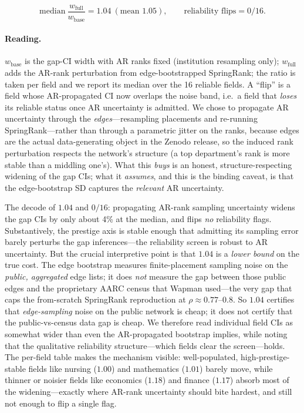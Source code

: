 \documentclass[11pt]{article}
\begin{document}
\[
\text{median}\ \frac{w_{\text{full}}}{w_{\text{base}}} = 1.04 \ (\text{mean }1.05),\qquad \text{reliability flips} = 0/16 .
\]

\paragraph{Reading.} $w_{\text{base}}$ is the gap-CI width with AR ranks fixed (institution resampling only); $w_{\text{full}}$ adds the AR-rank perturbation from edge-bootstrapped SpringRank; the ratio is taken per field and we report its median over the 16 reliable fields. A ``flip'' is a field whose AR-propagated CI now overlaps the noise band, i.e.\ a field that \emph{loses} its reliable status once AR uncertainty is admitted. We chose to propagate AR uncertainty through the \emph{edges}---resampling placements and re-running SpringRank---rather than through a parametric jitter on the ranks, because edges are the actual data-generating object in the Zenodo release, so the induced rank perturbation respects the network's structure (a top department's rank is more stable than a middling one's). What this \emph{buys} is an honest, structure-respecting widening of the gap CIs; what it \emph{assumes}, and this is the binding caveat, is that the edge-bootstrap SD captures the \emph{relevant} AR uncertainty.

The decode of $1.04$ and $0/16$: propagating AR-rank sampling uncertainty widens the gap CIs by only about 4\% at the median, and flips \emph{no} reliability flags. Substantively, the prestige axis is stable enough that admitting its sampling error barely perturbs the gap inferences---the reliability screen is robust to AR uncertainty. But the crucial interpretive point is that $1.04$ is a \emph{lower bound} on the true cost. The edge bootstrap measures finite-placement sampling noise on the \emph{public, aggregated} edge lists; it does \emph{not} measure the gap between those public edges and the proprietary AARC census that Wapman used---the very gap that caps the from-scratch SpringRank reproduction at $\rho\approx0.77$--$0.8$. So $1.04$ certifies that \emph{edge-sampling} noise on the public network is cheap; it does not certify that the public-vs-census data gap is cheap. We therefore read individual field CIs as somewhat wider than even the AR-propagated bootstrap implies, while noting that the qualitative reliability structure---which fields clear the screen---holds. The per-field table makes the mechanism visible: well-populated, high-prestige-stable fields like nursing ($1.00$) and mathematics ($1.01$) barely move, while thinner or noisier fields like economics ($1.18$) and finance ($1.17$) absorb most of the widening---exactly where AR-rank uncertainty should bite hardest, and still not enough to flip a single flag.
\end{document}

